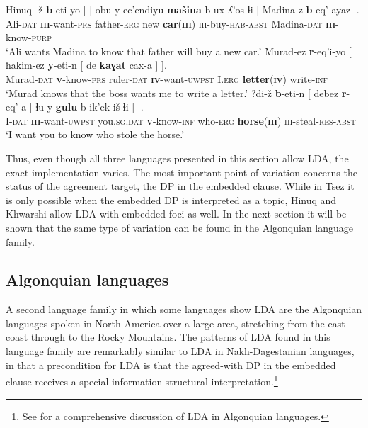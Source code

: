 \documentclass[output=paper
,modfonts
,nonflat]{langsci/langscibook}
\begin{document}
\begin{exe}
\ex Hinuq \citep[][633]{Forker2012} \label{ex:hinuq_cross-clausal}
	\xlist
	\ex \label{ex:hinuq_non-loc}
		\gll {}-\v{z} \textbf{b}-eti-yo [ [ obu-y ec'endiyu \textbf{ma\v{s}ina} b-ux-ʎ'os-ɬi ] Madina-z \textbf{b}-eq'-ayaz ].\\
			 Ali-\textsc{dat} \textbf{\textsc{iii}}-want-\textsc{prs} {} {} father-\textsc{erg} new \textbf{car}(\textbf{\textsc{iii}}) \textsc{iii}-buy-\textsc{hab}-\textsc{abst} {} Madina-\textsc{dat} \textbf{\textsc{iii}}-know-\textsc{purp}\\
		\glt `Ali wants Madina to know that father will buy a new car.'
	\ex \label{ex:hinuq_med}
		\gll Murad-ez \textbf{r}-eq'i-yo [ ħakim-ez \textbf{y}-eti-n [ de \textbf{kaɣat} cax-a ] ].\\
			 Murad-\textsc{dat} \textbf{\textsc{v}}-know-\textsc{prs} {} ruler-\textsc{dat} \textbf{\textsc{iv}}-want-\textsc{uwpst} {} I.\textsc{erg} \textbf{letter}(\textbf{\textsc{iv}}) write-\textsc{inf}\\
		\glt `Murad knows that the boss wants me to write a letter.'
	\ex \label{ex:hinuq_high}
		\gll ?di-\v{z} \textbf{b}-eti-n [ debez \textbf{r}-eq'-a [ ɬu-y \textbf{gulu} b-ik'ek-i\v{s}-ɬi ] ].\\
			 I-\textsc{dat} \textbf{\textsc{iii}}-want-\textsc{uwpst} {} you.\textsc{sg.dat} \textbf{\textsc{v}}-know-\textsc{inf} {} who-\textsc{erg} \textbf{horse}(\textbf{\textsc{iii}}) \textsc{iii}-steal-\textsc{res}-\textsc{abst}\\
		\glt `I want you to know who stole the horse.'
	\endxlist
\end{exe}
Thus, even though all three languages presented in this section allow LDA, the exact implementation varies. The most important point of variation concerns the status of the agreement target, the DP in the embedded clause. While in Tsez it is only possible when the embedded DP is interpreted as a topic, Hinuq and Khwarshi allow LDA with embedded foci as well. In the next section it will be shown that the same type of variation can be found in the Algonquian language family.

\subsection{Algonquian languages}

A second language family in which some languages show LDA are the Algonquian languages spoken in North America over a large area, stretching from the east coast through to the Rocky Mountains. The patterns of LDA found in this language family are remarkably similar to LDA in Nakh-Dagestanian languages, in that a precondition for LDA is that the agreed-with DP in the embedded clause receives a special information-structural interpretation.\footnote{See \citet{Fry_Hamilton2014} for a comprehensive discussion of LDA in Algonquian languages.}
\end{document}
